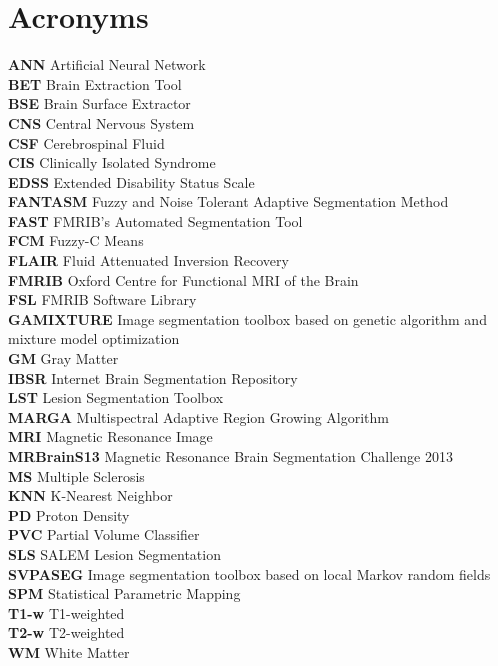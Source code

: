 
\chapter*{Acronyms}

\textbf{ANN} Artificial Neural Network\\
\textbf{BET} Brain Extraction Tool\\
\textbf{BSE} Brain Surface Extractor\\
\textbf{CNS} Central Nervous System\\
\textbf{CSF} Cerebrospinal Fluid\\
\textbf{CIS} Clinically Isolated Syndrome\\
\textbf{EDSS} Extended Disability Status Scale\\
\textbf{FANTASM} Fuzzy and Noise Tolerant Adaptive Segmentation Method\\
\textbf{FAST} FMRIB's Automated Segmentation Tool\\
\textbf{FCM} Fuzzy-C Means \\
\textbf{FLAIR} Fluid Attenuated Inversion Recovery\\
\textbf{FMRIB} Oxford Centre for Functional MRI of the Brain \\
\textbf{FSL} FMRIB Software Library\\
\textbf{GAMIXTURE} Image segmentation toolbox based on genetic algorithm and mixture model optimization\\
\textbf{GM} Gray Matter\\
\textbf{IBSR} Internet Brain Segmentation Repository\\
\textbf{LST} Lesion Segmentation Toolbox\\
\textbf{MARGA} Multispectral Adaptive Region Growing Algorithm \\
\textbf{MRI} Magnetic Resonance Image\\
\textbf{MRBrainS13} Magnetic Resonance Brain Segmentation Challenge 2013\\
\textbf{MS} Multiple Sclerosis\\
\textbf{KNN} K-Nearest Neighbor \\
\textbf{PD} Proton Density\\
\textbf{PVC} Partial Volume Classifier \\
\textbf{SLS} SALEM Lesion Segmentation \\
\textbf{SVPASEG} Image segmentation toolbox based on local Markov random fields\\
\textbf{SPM} Statistical Parametric Mapping\\
\textbf{T1-w} T1-weighted\\
\textbf{T2-w} T2-weighted\\
\textbf{WM} White Matter\\





